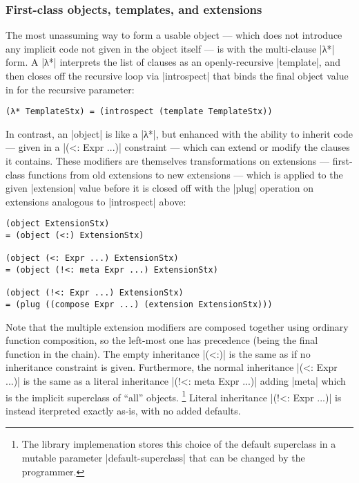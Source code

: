 \subsubsection{First-class objects, templates, and extensions}

The most unassuming way to form a usable object --- which does not introduce any implicit code not given in the object itself --- is with the multi-clause \scm|λ*| form.  A \scm|λ*| interprets the list of clauses as an openly-recursive \scm|template|, and then closes off the recursive loop via \scm|introspect| that binds the final object value in for the recursive parameter:
\begin{verbatim}
(λ* TemplateStx) = (introspect (template TemplateStx))
\end{verbatim}

In contrast, an \scm|object| is like a \scm|λ*|, but enhanced with the ability to inherit code --- given in a \scm|(<: Expr ...)| constraint --- which can extend or modify the clauses it contains.
These modifiers are themselves transformations on extensions --- first-class functions from old extensions to new extensions --- which is applied to the given \scm|extension| value before it is closed off with the \scm|plug| operation on extensions analogous to \scm|introspect| above:
\begin{verbatim}
(object ExtensionStx)
= (object (<:) ExtensionStx)

(object (<: Expr ...) ExtensionStx)
= (object (!<: meta Expr ...) ExtensionStx)

(object (!<: Expr ...) ExtensionStx)
= (plug ((compose Expr ...) (extension ExtensionStx)))

\end{verbatim}
Note that the multiple extension modifiers are composed together using ordinary function composition, so the left-most one has precedence (being the final function in the chain).
The empty inheritance \scm|(<:)| is the same as if no inheritance constraint is given.
Furthermore, the normal inheritance \scm|(<: Expr ...)| is the same as a literal inheritance \scm|(!<: meta Expr ...)| adding \scm|meta| which is the implicit superclass of ``all'' objects.%
\footnote{The library implemenation stores this choice of the default superclass in a mutable parameter \scm|default-superclass| that can be changed by the programmer.}
Literal inheritance \scm|(!<: Expr ...)| is instead iterpreted exactly as-is, with no added defaults.

